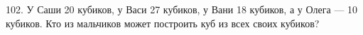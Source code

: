 102. У Саши 20 кубиков, у Васи 27 кубиков, у Вани 18 кубиков, а у Олега --- 10 кубиков. Кто из мальчиков может построить куб из всех своих кубиков?\\
